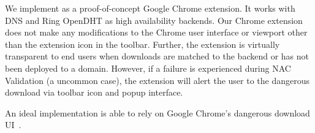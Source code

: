 We implement \SYSTEM{} as a proof-of-concept Google Chrome extension. It works
with DNS and Ring OpenDHT as high availability backends. Our Chrome extension
does not make any modifications to the Chrome user interface or viewport other
than the extension icon in the toolbar. Further, the extension is virtually
transparent to end users when downloads are matched to the backend or \SYSTEM{}
has not been deployed to a domain. However, if a failure is experienced during
NAC Validation (\ie a uncommon case), the extension will alert the user to the
dangerous download via toolbar icon and popup interface.


An ideal implementation is able to rely on Google Chrome's dangerous download
UI~\cite{ChromeClickThrough}.
